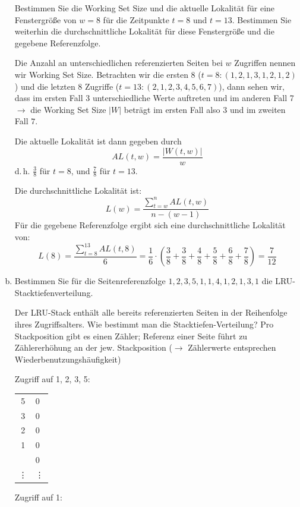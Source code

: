 \begin{enumerate}[a)]
Bestimmen Sie die Working Set Size und die aktuelle Lokalität für eine Fenstergröße von \(w = 8\) für die Zeitpunkte \(t=8\) und \(t=13\).
Bestimmen Sie weiterhin die durchschnittliche Lokalität für diese Fenstergröße und die gegebene Referenzfolge.

\begin{solution}
Die Anzahl an unterschiedlichen referenzierten Seiten bei $w$ Zugriffen nennen wir Working Set Size.
Betrachten wir  die ersten 8 (\(t=8: (1,2,1,3,1,2,1,2)\)) und die letzten 8 Zugriffe (\(t=13: (2,1,2,3,4,5,6,7)\)), dann sehen wir, dass im ersten Fall 3 unterschiedliche Werte auftreten und im anderen Fall 7 $\rightarrow$ die Working Set Size $|W|$ beträgt im ersten Fall also $3$ und im zweiten Fall $7$.

Die aktuelle Lokalität ist dann gegeben durch	\[AL(t, w) = \frac{|W(t, w)|}{w}\] d.\,h. $\frac{3}{8}$
für \(t=8\), und $\frac{7}{8}$ für \(t=13\).

Die durchschnittliche Lokalität ist: \[L(w) = \frac{\sum_{t = w}^n AL(t, w)}{n-(w-1)}\]
Für die gegebene Referenzfolge ergibt sich eine durchschnittliche Lokalität von:
\begin{equation*}
	 L(8) = \frac{\sum_{t = 8}^{13} AL(t, 8)}{6} = \frac{1}{6} \cdot (\frac{3}{8}+\frac{3}{8}+\frac{4}{8}+\frac{5}{8}+\frac{6}{8}+\frac{7}{8}) = \frac{7}{12}
\end{equation*}

\end{solution}

    \item Bestimmen Sie für die Seitenreferenzfolge $1, 2, 3, 5, 1, 1, 4, 1, 2, 1, 3, 1$ die LRU-Stack\-tie\-fen\-ver\-tei\-lung.

\begin{solution}
Der LRU-Stack enthält alle bereits referenzierten Seiten in der Reihenfolge ihres Zugriffsalters.
Wie bestimmt man die Stacktiefen-Verteilung? Pro Stackposition gibt es einen Zähler; Referenz einer Seite führt zu Zählererhöhung an der jew. Stackposition ($\rightarrow$ Zählerwerte entsprechen Wiederbenutzungshäufigkeit)


    \begin{minipage}{0.28\textwidth}
        \center
        Zugriff auf 1, 2, 3, 5:

        \begin{tabular}{ | c | l}
        	\cline{1-1}
        	5      & 0      \\ \cline{1-1}
        	3      & 0      \\ \cline{1-1}
        	2      & 0      \\ \cline{1-1}
        	1      & 0      \\ \cline{1-1}
        	       & 0      \\ \cline{1-1}
        	\vdots & \vdots \\ \cline{1-1}
        \end{tabular}
    \end{minipage}
    \begin{minipage}{0.22\textwidth}
        \center
        Zugriff auf 1:


\end{minipage}
\end{solution}
\end{enumerate}
